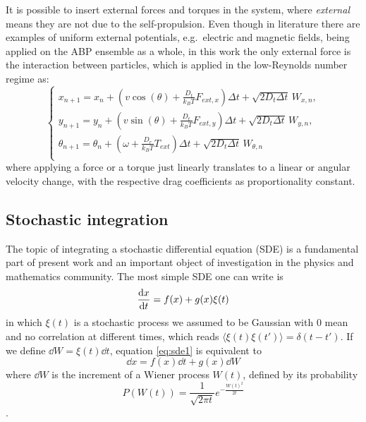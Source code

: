 \documentclass[../../master_thesis_np.tex]{subfiles}
\begin{document}
		It is possible to insert external forces and torques in the system, where \emph{external} means they are not due to the self-propulsion. Even though in literature there are examples of uniform external potentials, e.g.\ electric and magnetic fields, being applied on the ABP ensemble as a whole, in this work the only external force is the interaction between particles, which is applied in the low-Reynolds number regime as:
		\begin{equation} \label{eq:fin_diff_with_forces}
			\begin{cases}
				x_{n+1} = x_n + \left( v \cos(\theta) + \frac{D_t}{k_B T} F_{ext,x} \right) \Delta t + \sqrt{2D_t \Delta t} \, W_{x,n},\\
				y_{n+1} = y_n + \left( v \sin(\theta) + \frac{D_t}{k_B T} F_{ext,y} \right) \Delta t + \sqrt{2D_t \Delta t} \, W_{y,n},\\
				\theta_{n+1} = \theta_n +\left(\omega + \frac{D_r}{k_B T}{}T_{ext}\right) \Delta t + \sqrt{2D_t \Delta t} \, W_{\theta,n}\\
			\end{cases}
		\end{equation}
		where applying a force or a torque just linearly translates to a linear or angular velocity change, with the respective drag coefficients as proportionality constant.
		
		\subsection{Stochastic integration}
		The topic of integrating a stochastic differential equation (SDE) is a fundamental part of present work and an important object of investigation in the physics and mathematics community. The most simple SDE one can write is
		\begin{equation} \label{eq:sde1}
			\dv{x}{t} = f(x) + g(x)\xi(t)
		\end{equation}
		in which $\xi(t)$ is a stochastic process we assumed to be Gaussian with 0 mean and no correlation at different times, which reads $ \langle \xi(t) \xi(t') \rangle = \delta(t-t')$. If we define  $\dd{W} = \xi(t)\dd{t}$, equation \ref{eq:sde1} is equivalent to
		\begin{equation} \label{eq:sde2}
			\dd{x} = f(x)\dd{t} + g(x)\dd{W} 
		\end{equation} 
		where $\dd{W}$ is the increment of a Wiener process $W(t)$, defined by its probability
		\begin{equation} 
			P(W(t)) = \frac{1}{\sqrt{2 \pi t}} e^{-\frac{W(t)^2}{2t}}
		\end{equation}
		.
		
\end{document}
